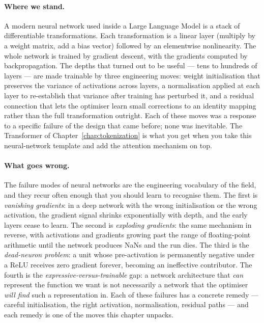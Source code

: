 \paragraph{Where we stand.}
A modern neural network used inside a Large Language Model is a
stack of differentiable transformations. Each transformation is a
linear layer (multiply by a weight matrix, add a bias vector)
followed by an elementwise nonlinearity. The whole network is
trained by gradient descent, with the gradients computed by
backpropagation. The depths that turned out to be useful --- tens
to hundreds of layers --- are made trainable by three engineering
moves: weight initialisation that preserves the variance of
activations across layers, a normalisation applied at each layer
to re-establish that variance after training has perturbed it, and
a residual connection that lets the optimiser learn small
corrections to an identity mapping rather than the full
transformation outright. Each of these moves was a response to a
specific failure of the design that came before; none was
inevitable. The Transformer of Chapter~\ref{chap:tokenization} is what you get when you
take this neural-network template and add the attention mechanism
on top.

\paragraph{What goes wrong.}
The failure modes of neural networks are the engineering
vocabulary of the field, and they recur often enough that you
should learn to recognise them. The first is \emph{vanishing
gradients}: in a deep network with the wrong initialisation or
the wrong activation, the gradient signal shrinks exponentially
with depth, and the early layers cease to learn. The second is
\emph{exploding gradients}: the same mechanism in reverse, with
activations and gradients growing past the range of floating-point
arithmetic until the network produces NaNs and the run dies. The
third is the \emph{dead-neuron problem}: a unit whose
pre-activation is permanently negative under a ReLU receives zero
gradient forever, becoming an ineffective contributor. The fourth
is the \emph{expressive-versus-trainable} gap: a network
architecture that \emph{can} represent the function we want is
not necessarily a network that the optimiser \emph{will find}
such a representation in. Each of these failures has a concrete
remedy --- careful initialisation, the right activation,
normalisation, residual paths --- and each remedy is one of the
moves this chapter unpacks.

